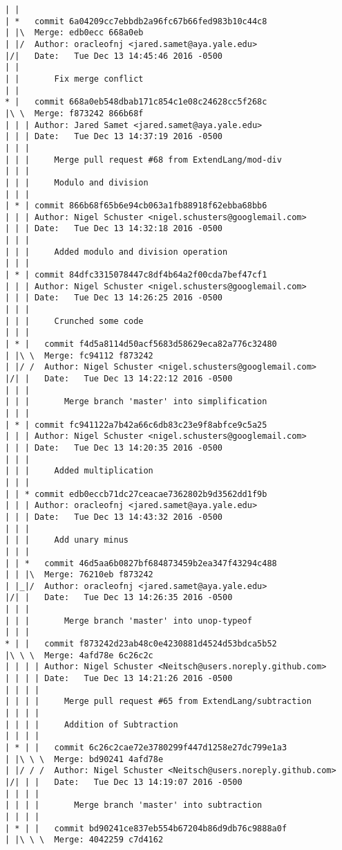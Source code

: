 \begin{lstlisting}
| |     
| *   commit 6a04209cc7ebbdb2a96fc67b66fed983b10c44c8
| |\  Merge: edb0ecc 668a0eb
| |/  Author: oracleofnj <jared.samet@aya.yale.edu>
|/|   Date:   Tue Dec 13 14:45:46 2016 -0500
| |   
| |       Fix merge conflict
| |     
* |   commit 668a0eb548dbab171c854c1e08c24628cc5f268c
|\ \  Merge: f873242 866b68f
| | | Author: Jared Samet <jared.samet@aya.yale.edu>
| | | Date:   Tue Dec 13 14:37:19 2016 -0500
| | | 
| | |     Merge pull request #68 from ExtendLang/mod-div
| | |     
| | |     Modulo and division
| | |    
| * | commit 866b68f65b6e94cb063a1fb88918f62ebba68bb6
| | | Author: Nigel Schuster <nigel.schusters@googlemail.com>
| | | Date:   Tue Dec 13 14:32:18 2016 -0500
| | | 
| | |     Added modulo and division operation
| | |    
| * | commit 84dfc3315078447c8df4b64a2f00cda7bef47cf1
| | | Author: Nigel Schuster <nigel.schusters@googlemail.com>
| | | Date:   Tue Dec 13 14:26:25 2016 -0500
| | | 
| | |     Crunched some code
| | |      
| * |   commit f4d5a8114d50acf5683d58629eca82a776c32480
| |\ \  Merge: fc94112 f873242
| |/ /  Author: Nigel Schuster <nigel.schusters@googlemail.com>
|/| |   Date:   Tue Dec 13 14:22:12 2016 -0500
| | |   
| | |       Merge branch 'master' into simplification
| | |    
| * | commit fc941122a7b42a66c6db83c23e9f8abfce9c5a25
| | | Author: Nigel Schuster <nigel.schusters@googlemail.com>
| | | Date:   Tue Dec 13 14:20:35 2016 -0500
| | | 
| | |     Added multiplication
| | |    
| | * commit edb0eccb71dc27ceacae7362802b9d3562dd1f9b
| | | Author: oracleofnj <jared.samet@aya.yale.edu>
| | | Date:   Tue Dec 13 14:43:32 2016 -0500
| | | 
| | |     Add unary minus
| | |      
| | *   commit 46d5aa6b0827bf684873459b2ea347f43294c488
| | |\  Merge: 76210eb f873242
| |_|/  Author: oracleofnj <jared.samet@aya.yale.edu>
|/| |   Date:   Tue Dec 13 14:26:35 2016 -0500
| | |   
| | |       Merge branch 'master' into unop-typeof
| | |      
* | |   commit f873242d23ab48c0e4230881d4524d53bdca5b52
|\ \ \  Merge: 4afd78e 6c26c2c
| | | | Author: Nigel Schuster <Neitsch@users.noreply.github.com>
| | | | Date:   Tue Dec 13 14:21:26 2016 -0500
| | | | 
| | | |     Merge pull request #65 from ExtendLang/subtraction
| | | |     
| | | |     Addition of Subtraction
| | | |       
| * | |   commit 6c26c2cae72e3780299f447d1258e27dc799e1a3
| |\ \ \  Merge: bd90241 4afd78e
| |/ / /  Author: Nigel Schuster <Neitsch@users.noreply.github.com>
|/| | |   Date:   Tue Dec 13 14:19:07 2016 -0500
| | | |   
| | | |       Merge branch 'master' into subtraction
| | | |       
| * | |   commit bd90241ce837eb554b67204b86d9db76c9888a0f
| |\ \ \  Merge: 4042259 c7d4162

\end{lstlisting}
